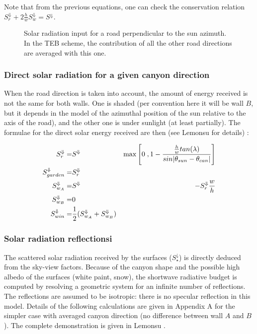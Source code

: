 Note that from the previous equations, one can check
the conservation relation ${S_r^\Downarrow} + 2 \frac{h}{w}{S_w^\Downarrow} = {S^\Downarrow}$.\\

\begin{figure}[t]
\hspace*{0.cm}
\caption{Solar radiation input for a road perpendicular to the sun azimuth.
In the TEB scheme, the contribution of all the other road directions
are averaged with this one.
\label{solar1}}
\end{figure}


\subsubsection{Direct solar radiation for a given canyon direction}

When the road direction is taken into account, the amount of energy received is not the same for both walls.
One is shaded (per convention here it will be wall $B$, but it depends in the model of the azimuthal position of the sun relative to the axis of the road), and the other one is under sunlight (at least partially).
The formulae for the direct solar energy received are then (see Lemonsu \nocite{Lemonsu2012} for details) :

\begin{eqnarray}
	S_r^\Downarrow = &{S^\Downarrow}& {\rm max} \left[0\; ,1 -  \frac{\frac{h}{w}tan(\lambda)}
{sin|\theta_{sun}-\theta_{can}|}\right] \\
S_{garden}^\Downarrow = &S_r^\Downarrow & \\
S_{w_A}^\Downarrow = &{S^\Downarrow}& - S_r^\Downarrow \frac{w}{h} \\
S_{w_B}^\Downarrow = &0& \\
S_{win}^\Downarrow = &\frac{1}{2}(S_{w_A}^\Downarrow + S_{w_B}^\Downarrow)&
\end{eqnarray}



\subsubsection{Solar radiation reflectionsi\label{reflect}}

The scattered solar radiation received by the surfaces ($S_\star^\downarrow$)
is directly deduced from the sky-view factors. Because of the canyon shape
and the possible high albedo of the surfaces (white paint, snow),
the shortwave radiative budget is computed
by resolving a geometric system for
an infinite number of reflections. The reflections
are assumed to be isotropic: there is no specular reflection
in this model. Details of the following calculations are given in Appendix
A for the simpler case with averaged canyon direction (no difference between wall $A$ and $B$). 
The complete demonstration is given in Lemonsu \nocite{Lemonsu2012}. \\

